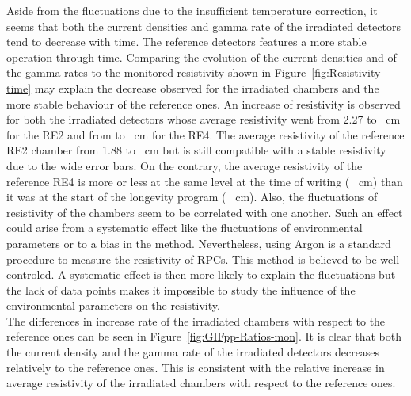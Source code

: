 	Aside from the fluctuations due to the insufficient temperature correction, it seems that both the current densities and gamma rate of the irradiated detectors tend to decrease with time. The reference detectors features a more stable operation through time. Comparing the evolution of the current densities and of the gamma rates to the monitored resistivity shown in Figure~\ref{fig:Resistivity-time} may explain the decrease observed for the irradiated chambers and the more stable behaviour of the reference ones. An increase of resistivity is observed for both the irradiated detectors whose average resistivity went from 2.27 to  \si{\Omega .cm} for the RE2 and from  to  \si{\Omega .cm} for the RE4. The average resistivity of the reference RE2 chamber from 1.88 to \si{\Omega .cm} but is still compatible with a stable  resistivity due to the wide error bars. On the contrary, the average resistivity of the reference RE4 is more or less at the same level at the time of writing ( \si{\Omega .cm}) than it was at the start of the longevity program ( \si{\Omega .cm}). Also, the fluctuations of resistivity of the chambers seem to be correlated with one another. Such an effect could arise from a systematic effect like the fluctuations of environmental parameters or to a bias in the method. Nevertheless, using Argon is a standard procedure to measure the resistivity of RPCs. This method is believed to be well controled. A systematic effect is then more likely to explain the fluctuations but the lack of data points makes it impossible to study the influence of the environmental parameters on the resistivity.\\
	The differences in increase rate of the irradiated chambers with respect to the reference ones can be seen in Figure~\ref{fig:GIFpp-Ratios-mon}. It is clear that both the current density and the gamma rate of the irradiated detectors decreases relatively to the reference ones. This is consistent with the relative increase in average resistivity of the irradiated chambers with respect to the reference ones.


